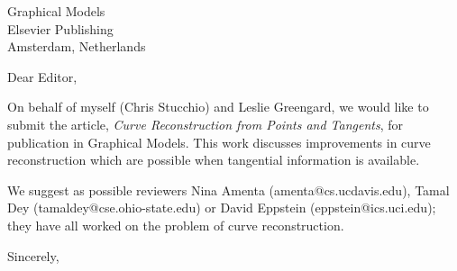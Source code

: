 \documentclass{letter}
\begin{document}
\begin{letter}{Graphical Models \\ Elsevier Publishing\\Amsterdam, Netherlands}
  \opening{Dear Editor,}

  On behalf of myself (Chris Stucchio) and Leslie Greengard, we would like to submit the article, \emph{Curve Reconstruction from Points and Tangents}, for publication in Graphical Models. This work discusses improvements in curve reconstruction which are possible when  tangential information is available.

  We suggest as possible reviewers Nina Amenta (amenta@cs.ucdavis.edu), Tamal Dey (tamaldey@cse.ohio-state.edu) or David Eppstein (eppstein@ics.uci.edu); they have all worked on the problem of curve reconstruction.

  \closing{Sincerely,}

\end{letter}
\end{document}
